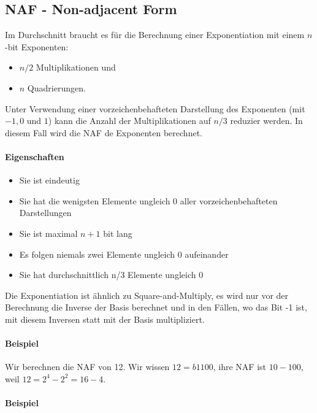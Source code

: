 \subsection{NAF - Non-adjacent Form}

Im Durchschnitt braucht es für die Berechnung einer Exponentiation mit einem $n$-bit Exponenten:

\begin{itemize}
    \item $n/2$ Multiplikationen und
    \item $n$ Quadrierungen.
\end{itemize}

Unter Verwendung einer vorzeichenbehafteten Darstellung des Exponenten (mit $-1, 0$ und $1$) kann die Anzahl der Multiplikationen auf $n/3$ reduzier werden. In diesem Fall
wird die NAF de Exponenten berechnet.

\paragraph{Eigenschaften}

\begin{itemize}
    \item Sie ist eindeutig
    \item Sie hat die wenigsten Elemente ungleich 0 aller vorzeichenbehafteten Darstellungen
    \item Sie ist maximal $n+1$ bit lang 
    \item Es folgen niemals zwei Elemente ungleich 0 aufeinander 
    \item Sie hat durchschnittlich n/3 Elemente ungleich 0
\end{itemize}

Die Exponentiation ist ähnlich zu Square-and-Multiply, es wird nur vor der Berechnung die Inverse der Basis berechnet und in den Fällen, wo das Bit -1 ist, mit diesem 
Inversen statt mit der Basis multipliziert.

\paragraph{Beispiel} 

Wir berechnen die NAF von 12. Wir wissen $12 = b1100$, ihre NAF ist $10-100$, weil $12 = 2^4 - 2^2 = 16 - 4$.

\paragraph{Beispiel}

